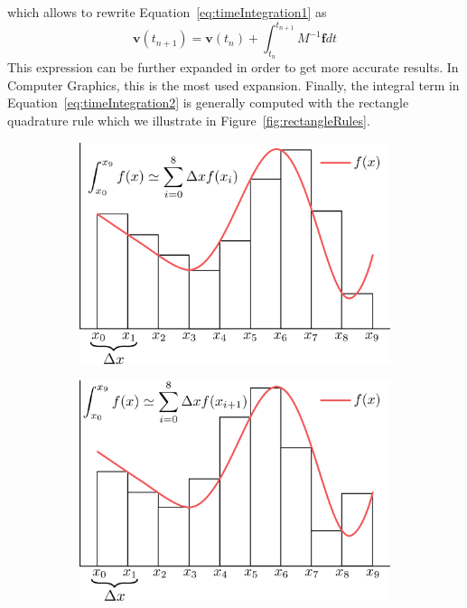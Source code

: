 which allows to rewrite Equation~\eqref{eq:timeIntegration1} as
\begin{equation}
\label{eq:timeIntegration2}
\mathbf{v}(t_{n+1}) = \mathbf{v}(t_{n}) + \int_{t_{n}}^{t_{n+1}} M^{-1}\mathbf{f}dt
\end{equation}
This expression can be further expanded in order to get more accurate results. In Computer Graphics, this is the most used expansion. Finally, the integral term in Equation~\eqref{eq:timeIntegration2} is generally computed with the rectangle quadrature rule which we illustrate in Figure~\ref{fig:rectangleRules}.
\begin{figure}[!ht]
	\centering
	\begin{subfigure}[b]{0.46\linewidth}
		\centering
		\includegraphics[width=\linewidth]{images/continuum_mechanics/rectangleRule_left.png}
		\caption{\label{fig:leftRectangleRule}}
	\end{subfigure}
	\hspace{0.2cm}
	\begin{subfigure}[b]{0.46\linewidth}
		\centering
		\includegraphics[width=\linewidth]{images/continuum_mechanics/rectangleRule_right.png}

\end{subfigure}
\end{figure}
